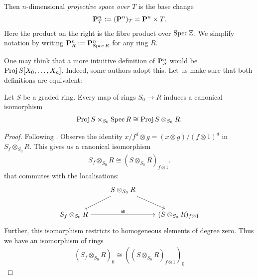 \documentclass{article}
\begin{document}
\begin{definition}
  Then $n$-dimensional \emph{projective space over $T$} is the
  base change
  \begin{align*}
    \mathbf{P}^{n}_{T} := (\mathbf{P}^{n}_{})_T = \mathbf{P}^{n}_{}\times T.
  \end{align*}
  Here the product on the right is the fibre product over
  $\operatorname{Spec}\mathbb{Z}$. We simplify notation by writing
  $\mathbf{P}^{n}_{R}:=\mathbf{P}^{n}_{\operatorname{Spec} R}$ for any ring $R$.
\end{definition}

One may think that a more intuitive definition of
$\mathbf{P}^{n}_{S}$ would be $\operatorname{Proj} S[X_0,\ldots,X_n]$. Indeed,
some authors adopt this. Let us make sure that both definitions
are equivalent:

\begin{lemma}
  Let $S$ be a graded ring. Every map of rings $S_0\to R$
  induces a canonical isomorphism
  \begin{align*}
    \operatorname{Proj} S\times_{S_0} \operatorname{Spec} R \cong \operatorname{Proj} S\otimes_{S_0} R.
  \end{align*}
  \begin{proof}
    Following \cite[Proposition 9.22]{ellingsrud2023}. Observe
    the identity $x/f^d\otimes g = (x\otimes g)/(f\otimes 1)^d$
    in $S_f\otimes_{S_0} R$. This gives us a canonical isomorphism
    \begin{align}\label{eq:base_change_ring_iso}
      S_f\otimes_{S_0} R \cong (S\otimes_{S_0} R)_{f\otimes 1}.
    \end{align}
    that commutes with the localisations:
    \begin{equation*}
      \begin{tikzcd}
  & {S\otimes_{S_0} R} \\
        {S_f\otimes_{S_0} R} && {(S\otimes_{S_0} R)_{f\otimes 1}}
        \arrow[from=1-2, to=2-1]
        \arrow[from=1-2, to=2-3]
        \arrow["\cong", from=2-1, to=2-3]
      \end{tikzcd}
    \end{equation*}
    Further, this isomorphism restricts to homogeneous elements of
    degree zero. Thus we have an isomorphism of rings
    \begin{align*}
      (S_f\otimes_{S_0} R)_0 \cong ((S\otimes_{S_0} R)_{f\otimes 1})_0
    \end{align*}

\end{proof}
\end{lemma}
\end{document}
